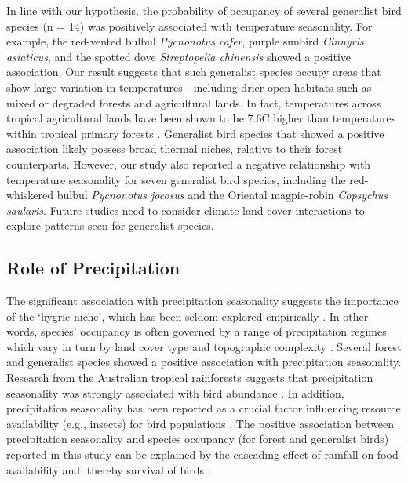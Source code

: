 In line with our hypothesis, the probability of occupancy of several generalist bird species (n = 14) was positively associated with temperature seasonality.
For example, the red-vented bulbul \textit{Pycnonotus cafer}, purple sunbird \textit{Cinnyris asiaticus}, and the spotted dove \textit{Streptopelia chinensis} showed a positive association.
Our result suggests that such generalist species occupy areas that show large variation in temperatures - including drier open habitats such as mixed or degraded forests and agricultural lands.
In fact, temperatures across tropical agricultural lands have been shown to be 7.6{\textdegree}C higher than temperatures within tropical primary forests \citep{senior2017}.
Generalist bird species that showed a positive association likely possess broad thermal niches, relative to their forest counterparts.
However, our study also reported a negative relationship with temperature seasonality for seven generalist bird species, including the red-whiskered bulbul \textit{Pycnonotus jocosus} and the Oriental magpie-robin \textit{Copsychus saularis}.
Future studies need to consider climate-land cover interactions to explore patterns seen for generalist species.

\subsection*{Role of Precipitation}

The significant association with precipitation seasonality suggests the importance of the `hygric niche', which has been seldom explored empirically \citep{boyle2020}.
In other words, species' occupancy is often governed by a range of precipitation regimes which vary in turn by land cover type and topographic complexity \citep{nowakowski2018}.
Several forest and generalist species showed a positive association with precipitation seasonality.
Research from the Australian tropical rainforests suggests that precipitation seasonality was strongly associated with bird abundance \citep{williams2008}.
In addition, precipitation seasonality has been reported as a crucial factor influencing resource availability (e.g., insects) for bird populations \citep{loiselle1991}.
The positive association between precipitation seasonality and species occupancy (for forest and generalist birds) reported in this study can be explained by the cascading effect of rainfall on food availability and, thereby survival of birds \citep{butt2015,boyle2020}.

